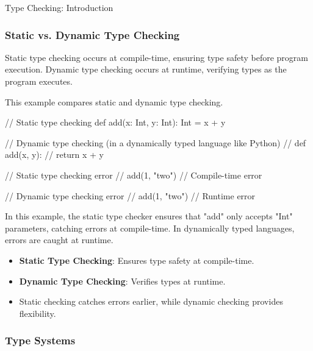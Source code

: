 \begin{notes}{Type Checking: Introduction}
\begin{highlight}
    \end{highlight}
    
    \subsubsection*{Static vs. Dynamic Type Checking}
    
    Static type checking occurs at compile-time, ensuring type safety before program execution. Dynamic type checking occurs at runtime, verifying types as the program executes.
    
    \begin{highlight}
    
        This example compares static and dynamic type checking.
    
    \begin{code}[Scala]
    // Static type checking
    def add(x: Int, y: Int): Int = x + y
    
    // Dynamic type checking (in a dynamically typed language like Python)
    // def add(x, y):
    //     return x + y
    
    // Static type checking error
    // add(1, "two")  // Compile-time error
    
    // Dynamic type checking error
    // add(1, "two")  // Runtime error
    \end{code}
    
        In this example, the static type checker ensures that "add" only accepts "Int" parameters, catching errors at compile-time. In dynamically typed languages, errors are caught at runtime.
    
        \begin{itemize}
            \item \textbf{Static Type Checking}: Ensures type safety at compile-time.
            \item \textbf{Dynamic Type Checking}: Verifies types at runtime.
            \item Static checking catches errors earlier, while dynamic checking provides flexibility.
        \end{itemize}
    
    \end{highlight}
    
    \subsubsection*{Type Systems}
    

\end{notes}
